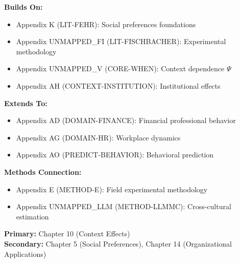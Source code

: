 \begin{tcolorbox}[colback=blue!5!white,colframe=blue!75!black,title=Cross-Reference Map]
\textbf{Builds On:}
\begin{itemize}
    \item Appendix K (LIT-FEHR): Social preferences foundations
    \item Appendix UNMAPPED_FI (LIT-FISCHBACHER): Experimental methodology
    \item Appendix UNMAPPED_V (CORE-WHEN): Context dependence $\Psi$
    \item Appendix AH (CONTEXT-INSTITUTION): Institutional effects
\end{itemize}

\textbf{Extends To:}
\begin{itemize}
    \item Appendix AD (DOMAIN-FINANCE): Financial professional behavior
    \item Appendix AG (DOMAIN-HR): Workplace dynamics
    \item Appendix AO (PREDICT-BEHAVIOR): Behavioral prediction
\end{itemize}

\textbf{Methods Connection:}
\begin{itemize}
    \item Appendix E (METHOD-E): Field experimental methodology
    \item Appendix UNMAPPED_LLM (METHOD-LLMMC): Cross-cultural estimation
\end{itemize}
\end{tcolorbox}

\begin{tcolorbox}[colback=green!5!white,colframe=green!75!black,title=Chapter Linkage]
\textbf{Primary:} Chapter 10 (Context Effects) \\
\textbf{Secondary:} Chapter 5 (Social Preferences), Chapter 14 (Organizational Applications)
\end{tcolorbox}

\begin{abstract}
This appendix integrates Michel Maréchal's research on honesty, corporate culture, and cross-cultural behavior into the Evidence-Based Framework. Maréchal's work demonstrates how institutional context---particularly corporate culture and professional identity---shapes ethical behavior, with profound implications for organizational design and policy. His global studies reveal both universal patterns and cultural variation in civic honesty. The research provides critical parameters for the context function $\Psi$ and establishes predictive links between laboratory behavior and real-world outcomes.
\end{abstract}


